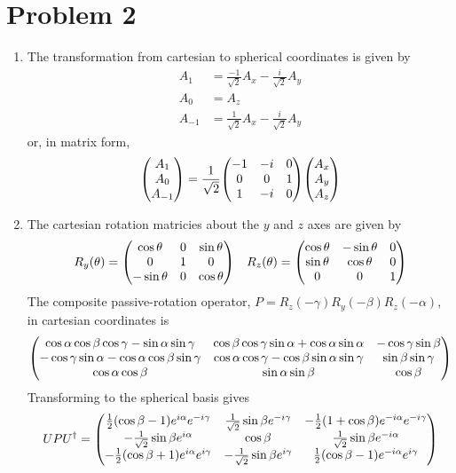 \documentclass[12pt]{article}
\begin{document}
\section*{Problem 2}
\begin{enumerate}[label=(\alph*)]
    \item The transformation from cartesian to spherical coordinates is given by
    \begin{align*}
        A_1 & = \frac{-1}{\sqrt{2}}A_x - \frac{i}{\sqrt{2}}A_y \\
        A_0 & = A_z \\
        A_{-1} & = \frac{1}{\sqrt{2}}A_x - \frac{i}{\sqrt{2}}A_y
    \end{align*}
    or, in matrix form,
    \[ \mqty(A_1\\A_0\\A_{-1}) = \frac{1}{\sqrt{2}}\mqty(-1&-i&0\\0&0&1\\1&-i&0)\mqty(A_x\\A_y\\A_z) \]
    
    \item The cartesian rotation matricies about the $y$ and $z$ axes are given by 
    \[ R_y(\theta) = \mqty(\cos\theta & 0 & \sin\theta \\ 0&1&0 \\ -\sin\theta & 0 & \cos\theta) \quad R_z(\theta) = \mqty(\cos\theta & -\sin\theta & 0 \\ \sin\theta & \cos\theta & 0 \\ 0&0&1) \]
    The composite passive-rotation operator, $P = R_z(-\gamma)R_y(-\beta)R_z(-\alpha)$, in cartesian coordinates is
    \[ \mqty(\cos\alpha\cos\beta\cos\gamma-\sin\alpha\sin\gamma & \cos\beta\cos\gamma\sin\alpha + \cos\alpha\sin\alpha & - \cos\gamma\sin\beta \\ -\cos\gamma\sin\alpha - \cos\alpha\cos\beta\sin\gamma & \cos\alpha\cos\gamma - \cos\beta\sin\alpha\sin\gamma & \sin\beta\sin\gamma \\ \cos\alpha\cos\beta & \sin\alpha\sin\beta & \cos\beta) \]
    Transforming to the spherical basis gives
    \[ UPU^\dag = \mqty(\frac{1}{2}(\cos\beta - 1)e^{i\alpha}e^{-i\gamma} & \frac{1}{\sqrt{2}}\sin\beta e^{-i\gamma} & -\frac{1}{2}(1 + \cos\beta)e^{-i\alpha}e^{-i\gamma} \\ -\frac{1}{\sqrt{2}}\sin\beta e^{i\alpha} & \cos\beta & \frac{1}{\sqrt{2}}\sin\beta e^{-i\alpha} \\ -\frac{1}{2}(\cos\beta + 1)e^{i\alpha}e^{i\gamma} & -\frac{1}{\sqrt{2}}\sin\beta e^{i\gamma} & \frac{1}{2}(\cos\beta - 1)e^{-i\alpha}e^{i\gamma}) \]
    
\end{enumerate}
\end{document}
